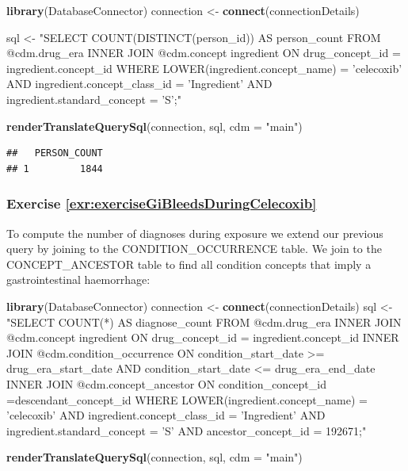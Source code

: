 \documentclass[11pt]{book}
\newenvironment{Shaded}{\begin{snugshade}}{\end{snugshade}}
\newcommand{\DataTypeTok}[1]{\textcolor[rgb]{0.13,0.29,0.53}{#1}}
\newcommand{\KeywordTok}[1]{\textcolor[rgb]{0.13,0.29,0.53}{\textbf{#1}}}
\newcommand{\NormalTok}[1]{#1}
\newcommand{\StringTok}[1]{\textcolor[rgb]{0.31,0.60,0.02}{#1}}
\theoremstyle{definition}
\theoremstyle{definition}
\theoremstyle{definition}
\theoremstyle{remark}
\begin{document}
\begin{Shaded}
\begin{Highlighting}[]
\KeywordTok{library}\NormalTok{(DatabaseConnector)}
\NormalTok{connection <-}\StringTok{ }\KeywordTok{connect}\NormalTok{(connectionDetails)}

\NormalTok{sql <-}\StringTok{ "SELECT COUNT(DISTINCT(person_id)) AS person_count}
\StringTok{FROM @cdm.drug_era}
\StringTok{INNER JOIN @cdm.concept ingredient}
\StringTok{  ON drug_concept_id = ingredient.concept_id}
\StringTok{WHERE LOWER(ingredient.concept_name) = 'celecoxib'}
\StringTok{  AND ingredient.concept_class_id = 'Ingredient'}
\StringTok{  AND ingredient.standard_concept = 'S';"}

\KeywordTok{renderTranslateQuerySql}\NormalTok{(connection, sql, }\DataTypeTok{cdm =} \StringTok{"main"}\NormalTok{)}
\end{Highlighting}
\end{Shaded}

\begin{verbatim}
##   PERSON_COUNT
## 1         1844
\end{verbatim}

\hypertarget{exercise-refexrexercisegibleedsduringcelecoxib}{%
\subsubsection*{Exercise \ref{exr:exerciseGiBleedsDuringCelecoxib}}\label{exercise-refexrexercisegibleedsduringcelecoxib}}

To compute the number of diagnoses during exposure we extend our previous query by joining to the CONDITION\_OCCURRENCE table. We join to the CONCEPT\_ANCESTOR table to find all condition concepts that imply a gastrointestinal haemorrhage:

\begin{Shaded}
\begin{Highlighting}[]
\KeywordTok{library}\NormalTok{(DatabaseConnector)}
\NormalTok{connection <-}\StringTok{ }\KeywordTok{connect}\NormalTok{(connectionDetails)}
\NormalTok{sql <-}\StringTok{ "SELECT COUNT(*) AS diagnose_count}
\StringTok{FROM @cdm.drug_era}
\StringTok{INNER JOIN @cdm.concept ingredient}
\StringTok{  ON drug_concept_id = ingredient.concept_id}
\StringTok{INNER JOIN @cdm.condition_occurrence}
\StringTok{  ON condition_start_date >= drug_era_start_date}
\StringTok{    AND condition_start_date <= drug_era_end_date}
\StringTok{INNER JOIN @cdm.concept_ancestor }
\StringTok{  ON condition_concept_id =descendant_concept_id}
\StringTok{WHERE LOWER(ingredient.concept_name) = 'celecoxib'}
\StringTok{  AND ingredient.concept_class_id = 'Ingredient'}
\StringTok{  AND ingredient.standard_concept = 'S'}
\StringTok{  AND ancestor_concept_id = 192671;"}

\KeywordTok{renderTranslateQuerySql}\NormalTok{(connection, sql, }\DataTypeTok{cdm =} \StringTok{"main"}\NormalTok{)}
\end{Highlighting}
\end{Shaded}
\end{document}
